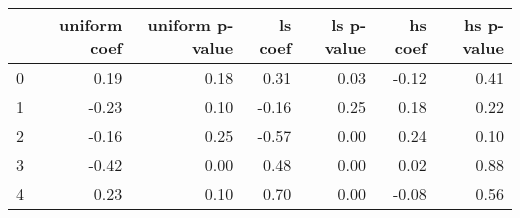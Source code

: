 \begin{tabular}{lrrrrrr}
\toprule
 & uniform coef & uniform p-value & ls coef & ls p-value & hs coef & hs p-value \\
\midrule
0 & 0.19 & 0.18 & 0.31 & 0.03 & -0.12 & 0.41 \\
1 & -0.23 & 0.10 & -0.16 & 0.25 & 0.18 & 0.22 \\
2 & -0.16 & 0.25 & -0.57 & 0.00 & 0.24 & 0.10 \\
3 & -0.42 & 0.00 & 0.48 & 0.00 & 0.02 & 0.88 \\
4 & 0.23 & 0.10 & 0.70 & 0.00 & -0.08 & 0.56 \\
\bottomrule
\end{tabular}
